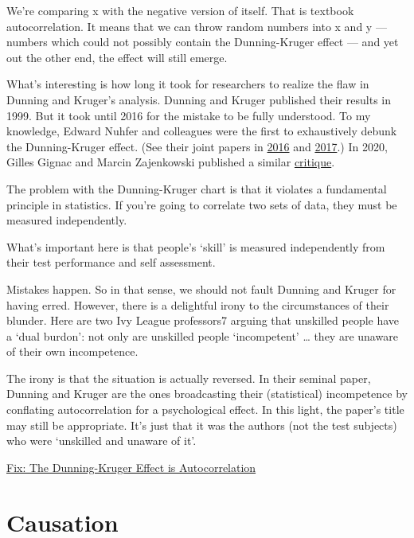 \documentclass[
]{book}
\begin{document}
We're comparing x with the negative version of itself. That is textbook autocorrelation. It means that we can throw random numbers into x and y --- numbers which could not possibly contain the Dunning-Kruger effect --- and yet out the other end, the effect will still emerge.

What's interesting is how long it took for researchers to realize the flaw in Dunning and Kruger's analysis. Dunning and Kruger published their results in 1999. But it took until 2016 for the mistake to be fully understood. To my knowledge, Edward Nuhfer and colleagues were the first to exhaustively debunk the Dunning-Kruger effect. (See their joint papers in \href{https://digitalcommons.usf.edu/cgi/viewcontent.cgi?article=1188\&context=numeracy}{2016} and \href{https://digitalcommons.usf.edu/cgi/viewcontent.cgi?article=1215\&context=numeracy}{2017}.) In 2020, Gilles Gignac and Marcin Zajenkowski published a similar \href{https://www.gwern.net/docs/iq/2020-gignac.pdf}{critique}.

The problem with the Dunning-Kruger chart is that it violates a fundamental principle in statistics. If you're going to correlate two sets of data, they must be measured independently.

What's important here is that people's `skill' is measured independently from their test performance and self assessment.

Mistakes happen. So in that sense, we should not fault Dunning and Kruger for having erred. However, there is a delightful irony to the circumstances of their blunder. Here are two Ivy League professors7 arguing that unskilled people have a `dual burdon': not only are unskilled people `incompetent' \ldots{} they are unaware of their own incompetence.

The irony is that the situation is actually reversed. In their seminal paper, Dunning and Kruger are the ones broadcasting their (statistical) incompetence by conflating autocorrelation for a psychological effect. In this light, the paper's title may still be appropriate. It's just that it was the authors (not the test subjects) who were `unskilled and unaware of it'.

\href{https://economicsfromthetopdown.com/2022/04/08/the-dunning-kruger-effect-is-autocorrelation/}{Fix: The Dunning-Kruger Effect is Autocorrelation}

\hypertarget{causation}{%
\chapter{Causation}\label{causation}}
\end{document}
